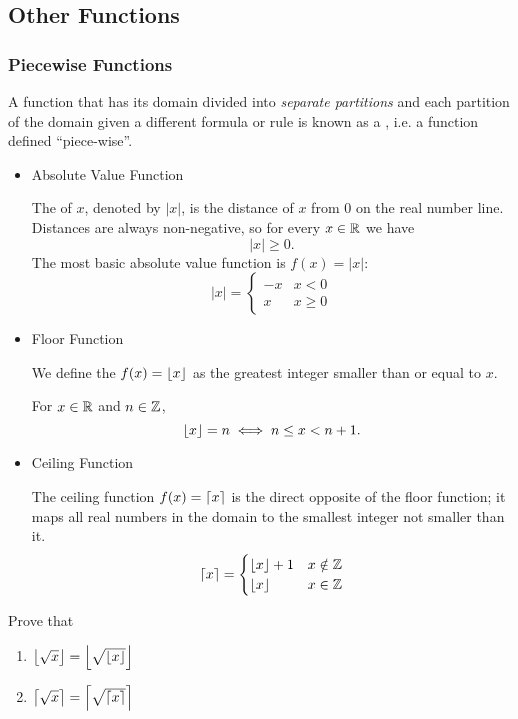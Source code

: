 \subsection{Other Functions}
\subsubsection{Piecewise Functions}
A function that has its domain divided into \emph{separate partitions} and each partition of the domain given a different formula or rule is known as a , i.e. a function defined ``piece-wise''.

\begin{itemize}
\item Absolute Value Function

The  of $x$, denoted by $|x|$, is the distance of $x$ from $0$ on the real number line. Distances are always non-negative, so for every $x\in\mathbb R$ we have 
\[ |x|\ge0. \]
The most basic absolute value function is $f(x)=|x|$:
\[ |x|=\begin{cases}
-x & x<0 \\
x & x\ge0
\end{cases} \]

\item Floor Function

We define the  $f(x)=\left\lfloor x \right\rfloor$ as the greatest integer smaller than or equal to $x$.

For $x\in\mathbb R$ and $n\in\mathbb Z$,
\[ \left\lfloor x \right\rfloor=n\iff n\le x<n+1. \]

\item Ceiling Function

The ceiling function $f(x)=\left\lceil x \right\rceil$ is the direct opposite of the floor function; it maps all real numbers in the domain to the smallest integer not smaller than it.
\[ \left\lceil x \right\rceil=\begin{cases}
\left\lfloor x \right\rfloor+1 & x\notin\mathbb Z \\
\left\lfloor x \right\rfloor & x\in\mathbb Z
\end{cases} \]
\end{itemize}

\begin{exercise}{}{}
Prove that
\begin{enumerate}[label=(\alph*)]
\item $\left\lfloor \sqrt{x} \right\rfloor=\left\lfloor \sqrt{\left\lfloor x \right\rfloor} \right\rfloor$
\item $\left\lceil \sqrt{x} \right\rceil=\left\lceil \sqrt{\left\lceil x \right\rceil} \right\rceil$
\end{enumerate}
\end{exercise}

